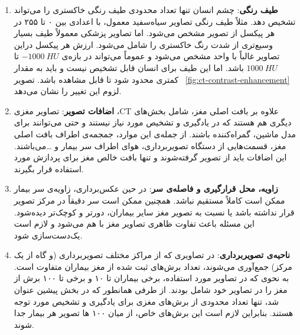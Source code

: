 \begin{enumerate}
        \item \textbf{طیف رنگی}:  چشم انسان تنها تعداد محدودی طیف رنگی خاکستری را می‌تواند تشخیص دهد. مثلاً طیف رنگی تصاویر سیاه‌سفید معمول، با اعدادی بین ۰ تا ۲۵۵ در هر پیکسل از تصویر مشخص می‌شود.
        اما تصاویر پزشکی معمولاً طیف بسیار وسیع‌تری از شدت رنگ خاکستری را شامل می‌شود. 
        ارزش هر پیکسل دراین تصاویر غالباً با واحد  مشخص می‌شود و عموماً می‌تواند در بازه‌ی $-1000\ HU$ تا $1000\ HU$ باشد.
        اما این طیف برای انسان قابل تشخیص نیست و باید به مقدار کمتری محدود شود تا قابل مشاهده باشد. 
         تصویر ~\ref{fig:ct-contrast-enhancement} لزوم این تغییر را نشان می‌دهد.
        \item \textbf{اضافات تصویر}: تصاویر مغزی ،CT علاوه بر بافت اصلی مغز، شامل بخش‌های دیگری هم هستند که در یادگیری و تشخیص مورد نیاز نیستند و حتی می‌توانند برای مدل ماشین، گمراه‌کننده باشند.
        از جمله‌ی این موارد، جمجمه‌ی اطراف بافت اصلی مغز، قسمت‌هایی از دستگاه تصویربرداری، هوای اطراف سر بیمار و \dots می‌باشند.
        این اضافات باید از تصویر گرفته‌شوند و تنها بافت خالص مغز برای پردازش مورد استفاده قرار بگیرند.
        \item \textbf{زاویه، محل قرار‌گیری و فاصله‌ی سر}: در حین عکس‌برداری، زاویه‌ی سر بیمار ممکن است کاملاً مستقیم نباشد.
        همچنین ممکن است سر دقیقاً در مرکز تصویر قرار نداشته باشد یا نسبت به تصویر مغز سایر بیماران، دورتر و کوچک‌تر دیده‌شود.
        این مسئله باعث تفاوت ظاهری تصاویر مغز با هم می‌شود و لازم است یک‌دست‌سازی شود.
        \item \textbf{ناحیه‌ی تصویربرداری}: در تصاویری که از مراکز مختلف تصویربرداری (و گاه از یک مرکز) جمع‌آوری می‌شوند، 
        تعداد برش‌های ثبت شده از مغز بیماران متفاوت است.
        به نحوی که در تصاویر مورد استفاده، برخی بیماران تا ۱۰ و برخی تا ۱۰۰ برش از مغز را در تصاویر خود شامل بودند.
        از طرفی همانطور که در بخش پیشین عنوان شد، تنها تعداد محدودی از برش‌های مغزی برای یادگیری و تشخیص مورد توجه هستند.
        بنابراین لازم است این برش‌های خاص، از میان ۱۰۰ ها تصویر هر بیمار جدا شوند. 
\end{enumerate}


